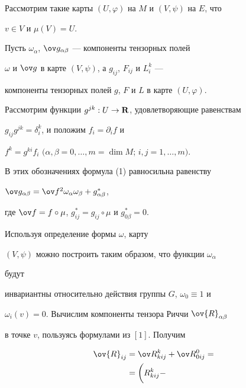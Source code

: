\begin{pf}


Рассмотрим такие карты $(U,\varphi)$ на $M$ и $(V,\psi)$ на $E$, что


$v\in V$ и $\mu(V)=U$.


Пусть $\omega_{\alpha}$, $\g_{\alpha\beta}$ --- компоненты тензорных полей


$\omega$ и $\g$ в карте $(V,\psi)$, а $g_{ij}$, $F_{ij}$ и $L_{i}^{k}$ ---


компоненты тензорных полей $g$, $F$ и $L$ в карте $(U,\varphi)$.


Рассмотрим функции $g^{jk} :U\to{\bold R}$, удовлетворяющие равенствам


$g_{ij}g^{jk}=\delta_{i}^{k}$, и положим $f_{i}=\partial_{i}f$ и


$f^{k}=g^{ki}f_{i}$ $(\alpha,\beta=0,\dotsc,m=\dim M$; $i,j=1,\dotsc,m)$.


В этих обозначениях формула (1) равносильна равенству


$\g_{\alpha\beta}=


\ov f^{2}\omega_{\alpha}\omega_{\beta}+g^*_{\alpha\beta}$,


где $\ov f=f\circ\mu$, $g^*_{ij}=g_{ij}\circ\mu$ и $g^*_{0\beta}=0$.


Используя определение формы $\omega$, карту


$(V,\psi)$ можно построить таким образом, что функции $\omega_{\alpha}$


будут


инвариантны относительно действия группы $G$, $\omega_{0}\equiv1$ и


$\omega_{i}(v)=0$. Вычислим компоненты тензора Риччи $\ov{R}_{\alpha\beta}$


в точке $v$, пользуясь формулами из $[1]$. Получим


\begin{equation}








\begin{split}


\ov{R}_{ij}&=\ov R^{k}_{kij}+\ov R^{0}_{0ij}=\\






&=\bigg(R^{k}_{kij}-



\end{split}
\end{equation}
\end{pf}
